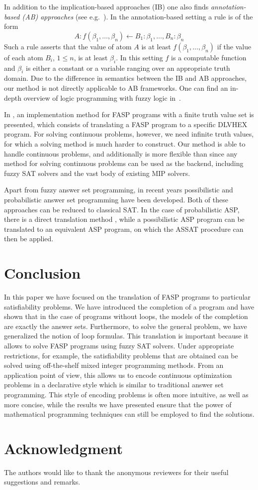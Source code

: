 \documentclass{tlp}
\begin{document}
In addition to the implication-based approaches (IB) one also finds \emph{annotation-based (AB) approaches} (see e.g.~\cite{straccia-annotated}). In the annotation-based setting a rule is of the form 
 $$A: f(\beta_{1},\ldots,\beta_{n}) \gets B_{1} : \beta_{1},\ldots,B_{n} : \beta_{n}$$
Such a rule asserts that the value of atom $A$ is at least $f(\beta_{1},\ldots,\beta_{n})$ if the value of each atom $B_{i}$, $1 \leq n$, is at least $\beta_{i}$. In this setting $f$ is a computable function and $\beta_{i}$ is either a constant or a variable ranging over an appropriate truth domain. Due to the difference in semantics between the IB and AB approaches, our method is not directly applicable to AB frameworks. One can find an in-depth overview of logic programming with fuzzy logic in~\cite{Straccia:reasoningweb}.

In \cite{fasp1}, an implementation method for FASP programs with a finite truth value set is presented, which consists of translating a FASP program to a specific DLVHEX program. For solving continuous problems, however, we need infinite truth values, for which a solving method is much harder to construct. Our method is able to handle continuous problems, and additionally is more flexible than \cite{fasp1} since any method for solving continuous problems can be used as the backend, including fuzzy SAT solvers and the vast body of existing MIP solvers.

Apart from fuzzy answer set programming, in recent years possibilistic and probabilistic answer set programming have been developed. Both of these approaches can be reduced to classical SAT. In the case of probabilistic ASP, there is a direct translation method \cite{Saad:ECSQARU2009}, while a possibilistic ASP program can be translated to an equivalent ASP program, on which the ASSAT procedure can then be applied. 


\section{Conclusion}\label{sec:conclusion}

In this paper we have focused on the translation of FASP programs to particular satisfiability problems. We have introduced the completion of a program and have shown that in the case of programs without loops, the models of the completion are exactly the answer sets. Furthermore, to solve the general problem, we have generalized the notion of loop formulas. This translation is important because it allows to solve FASP programs using fuzzy SAT solvers. Under appropriate restrictions, for example, the satisfiability problems that are obtained can be solved using off-the-shelf mixed integer programming methods.  From an application point of view, this allows us to encode continuous optimization problems in a declarative style which is similar to traditional answer set programming.   This style of encoding problems is often more intuitive, as well as more concise, while the results we have presented ensure that the power of mathematical programming techniques can still be employed to find the solutions.

\section*{Acknowledgment}
The authors would like to thank the anonymous reviewers for their useful suggestions and remarks.


\end{document}
